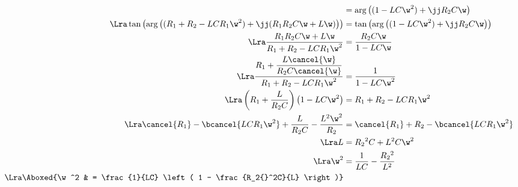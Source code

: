 \documentclass[../TDE6_rsf.tex]{subfiles}%
\begin{document}
{\begin{align*}
		 & = \arg \left( (1-LC\w^2) + \jj R_2C\w \right)                  \\
		\Lra
		\tan \left(\arg \left( (R_1 + R_2 - LCR_1\w^2) + \jj(R_1R_2C\w + L\w) \right)\right)
		 & = \tan\left(\arg \left( (1-LC\w^2) + \jj R_2C\w \right)\right) \\
		\Lra
		\frac{R_1R_2C\w + L\w}{R_1 + R_2 - LCR_1\w^2}
		 & = \frac{R_2C\w}{1-LC\w}                                        \\
		\Lra
		\frac{R_1 + \dfrac{L\cancel{\w}}{R_2C\cancel{\w}}}{R_1 + R_2 - LCR_1\w^2}
		 & = \frac{1}{1-LC\w^2}                                           \\
		\Lra
		\left( R_1 + \frac{L}{R_2C} \right) \left( 1-LC\w^2 \right)
		 & = R_1 + R_2 - LCR_1\w^2                                        \\
		\Lra
		\cancel{R_1} - \bcancel{LCR_1\w^2} + \frac{L}{R_2C} - \frac{L^2\w^2}{R_2}
		 & = \cancel{R_1} + R_2 - \bcancel{LCR_1\w^2}                     \\
		\Lra
		L
		 & = R_2{}^2 C + L^2C\w^2                                         \\
		\Lra
		\w^2
		 & = \frac{1}{LC} - \frac{R_2{}^2}{L^2}                           \\
		\Lra
		\Aboxed{\w^2
		 & = \frac{1}{LC} \left( 1 - \frac{R_2{}^2C}{L} \right)}
	\end{align*}
}
\end{document}
